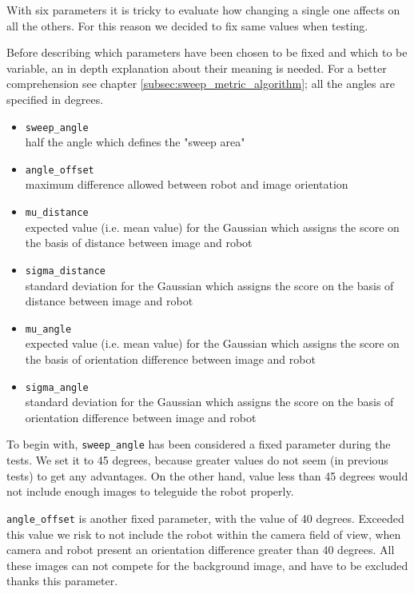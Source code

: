 With six parameters it is tricky to evaluate how changing a single one affects on all the others. For this
reason we decided to fix same values when testing.
%

%
Before describing which parameters have been chosen to be fixed and which to be variable, an in depth explanation
about their meaning is needed. For a better comprehension see chapter \ref{subsec:sweep_metric_algorithm}; all
the angles are specified in degrees.

%
\begin{itemize}

  \item \texttt{sweep\_angle} \\
    half the angle which defines the "sweep area" 
  \item \texttt{angle\_offset} \\
    maximum difference allowed between robot and image orientation 

  \item \texttt{mu\_distance} \\
    expected value (i.e. mean value) for the Gaussian which assigns the score on the basis of distance between
    image and robot
  \item \texttt{sigma\_distance} \\
    standard deviation for the Gaussian which assigns the score on the basis of distance between image and robot

  \item \texttt{mu\_angle} \\
    expected value (i.e. mean value) for the Gaussian which assigns the score on the basis of orientation difference
    between image and robot
  \item \texttt{sigma\_angle} \\
    standard deviation for the Gaussian which assigns the score on the basis of orientation difference between image
    and robot

\end{itemize}
%

%
To begin with, \texttt{sweep\_angle} has been considered a fixed parameter during the tests. We set it to 45 degrees,
because greater values do not seem (in previous tests) to get any advantages. On the other hand, value less than 45
degrees would not include enough images to teleguide the robot properly.
%

%
\texttt{angle\_offset} is another fixed parameter, with the value of 40 degrees. Exceeded this value we risk to not include
the robot within the camera field of view, when camera and robot present an orientation difference greater than 40 degrees.
All these images can not compete for the background image, and have to be excluded thanks this parameter.
%


